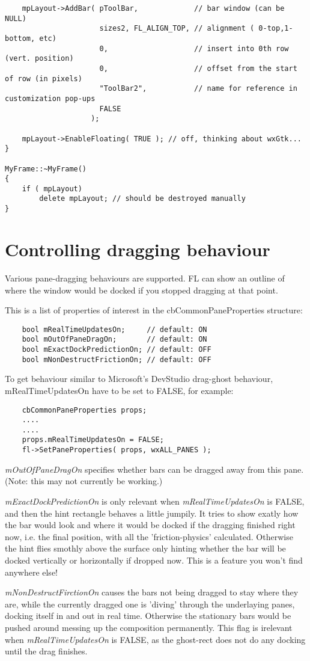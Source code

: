 \begin{verbatim}
    mpLayout->AddBar( pToolBar,             // bar window (can be NULL)
                      sizes2, FL_ALIGN_TOP, // alignment ( 0-top,1-bottom, etc)
                      0,                    // insert into 0th row (vert. position)
                      0,                    // offset from the start of row (in pixels)
                      "ToolBar2",           // name for reference in customization pop-ups
                      FALSE
                    );

    mpLayout->EnableFloating( TRUE ); // off, thinking about wxGtk...
}

MyFrame::~MyFrame()
{
    if ( mpLayout)
        delete mpLayout; // should be destroyed manually
}
\end{verbatim}

\section{Controlling dragging behaviour}\label{controllingdragbehav}

Various pane-dragging behaviours are supported. FL can
show an outline of where the window would be docked
if you stopped dragging at that point.

This is a list of properties of interest in the cbCommonPaneProperties
structure:

\begin{verbatim}
    bool mRealTimeUpdatesOn;     // default: ON
    bool mOutOfPaneDragOn;       // default: ON
    bool mExactDockPredictionOn; // default: OFF
    bool mNonDestructFrictionOn; // default: OFF
\end{verbatim}

To get behaviour similar to Microsoft's DevStudio drag-ghost behaviour,
mRealTimeUpdatesOn have to be set to FALSE, for example:

\begin{verbatim}
    cbCommonPaneProperties props;
    ....
    ....
    props.mRealTimeUpdatesOn = FALSE;
    fl->SetPaneProperties( props, wxALL_PANES );
\end{verbatim}

{\it mOutOfPaneDragOn} specifies whether bars can be dragged
away from this pane. (Note: this may not currently be working.)

{\it mExactDockPredictionOn} is only relevant when {\it mRealTimeUpdatesOn} is FALSE,
and then the hint rectangle behaves a little jumpily. It tries to show
exatly how the bar would look and where it would be docked if the dragging finished right
now, i.e. the final position, with all the 'friction-physics' calculated.
Otherwise the hint flies smothly above the surface only hinting whether the bar
will be docked vertically or horizontally if dropped now.
This is a feature you won't find anywhere else!

{\it mNonDestructFirctionOn} causes the bars not being dragged
to stay where they are, while the currently dragged one is 'diving'
through the underlaying panes, docking itself in and out in real time.
Otherwise the stationary bars would be pushed around messing up the composition permanently.
This flag is irelevant when {\it mRealTimeUpdatesOn} is FALSE, as the ghost-rect
does not do any docking until the drag finishes.

